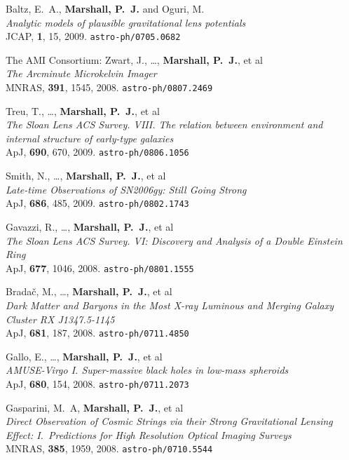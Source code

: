 \begin{revnumerate}
\item{Baltz, E.~A., \textbf{{Marshall}, P.~J.} and Oguri, M.\\
\textit{Analytic models of plausible gravitational lens potentials}\\
JCAP, \textbf{1}, 15, 2009.
\texttt{astro-ph/0705.0682}
}

\item{The AMI Consortium: Zwart, J., \ldots, \textbf{{Marshall}, P.~J.}, et al\\
\textit{The Arcminute Microkelvin Imager}\\
MNRAS, \textbf{391}, 1545, 2008.
\texttt{astro-ph/0807.2469}
}

\item{Treu, T., \ldots, \textbf{{Marshall}, P.~J.}, et al\\
\textit{The Sloan Lens ACS Survey. VIII. The relation between environment and internal structure of early-type galaxies}\\
ApJ, \textbf{690}, 670, 2009.
\texttt{astro-ph/0806.1056}
}

\item{Smith, N., \ldots, \textbf{{Marshall}, P.~J.}, et al\\
\textit{Late-time Observations of SN2006gy: Still Going Strong}\\
ApJ, \textbf{686}, 485, 2009.
\texttt{astro-ph/0802.1743}
}

\item{Gavazzi, R., \ldots, \textbf{{Marshall}, P.~J.}, et al\\
\textit{The Sloan Lens ACS Survey. VI: Discovery and Analysis of a Double Einstein Ring}\\
ApJ, \textbf{677}, 1046, 2008.
\texttt{astro-ph/0801.1555}
}

\item{Brada\v{c}, M., \ldots, \textbf{{Marshall}, P.~J.}, et al\\
\textit{Dark Matter and Baryons in the Most X-ray Luminous and Merging Galaxy Cluster RX J1347.5-1145}\\
ApJ, \textbf{681}, 187, 2008.
\texttt{astro-ph/0711.4850}
}

\item{Gallo, E., \ldots, \textbf{{Marshall}, P.~J.}, et al\\
\textit{AMUSE-Virgo I. Super-massive black holes in low-mass spheroids}\\
ApJ, \textbf{680}, 154, 2008.
\texttt{astro-ph/0711.2073}
}

\item{Gasparini, M.~A, \textbf{{Marshall}, P.~J.}, et al\\
\textit{Direct Observation of Cosmic Strings via their Strong Gravitational Lensing Effect: I.~Predictions for High Resolution Optical Imaging Surveys}\\
MNRAS, \textbf{385}, 1959, 2008.
\texttt{astro-ph/0710.5544}
}


\end{revnumerate}
